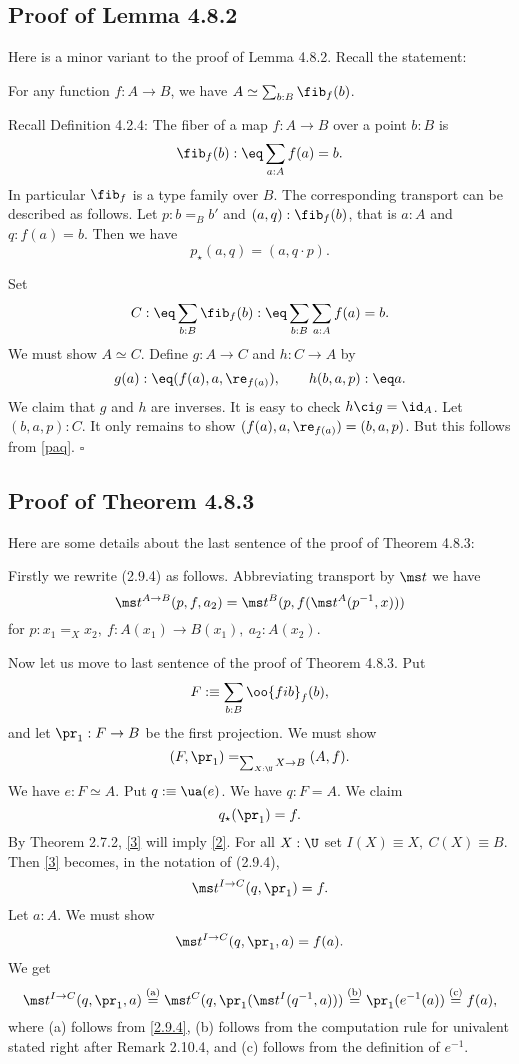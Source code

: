 \documentclass[12pt]{article}
\begin{document}

\subsection{Proof of Lemma 4.8.2}\label{482}

Here is a minor variant to the proof of Lemma 4.8.2. Recall the statement:

For any function $f:A\to B$, we have $A\simeq\sum_{b:B}\fib_f(b)$.

Recall Definition 4.2.4: The fiber of a map $f:A\to B$ over a point $b:B$ is 
$$
\fib_f(b):\eq\sum_{a:A}f(a)=b.
$$ 
In particular $\fib_f$ is a type family over $B$. The corresponding transport can be described as follows. Let $p:b=_Bb'$ and $(a,q):\fib_f(b)$, that is $a:A$ and $q:f(a)=b$. Then we have 
\begin{equation}\label{paq}
p_\star(a,q)=(a,q\cdot p).
\end{equation}

Set 
$$
C:\eq\sum_{b:B}\fib_f(b):\eq\sum_{b:B}\sum_{a:A}f(a)=b.
$$ 
We must show $A\simeq C$. Define $g:A\to C$ and $h:C\to A$ by 
$$
g(a):\eq(f(a),a,\re_{f(a)}),\qquad h(b,a,p):\eq a.
$$ 
We claim that $g$ and $h$ are inverses. It is easy to check $h\ci g=\id_A$. Let $(b,a,p):C$. It only remains to show $(f(a),a,\re_{f(a)})=(b,a,p)$. But this follows from \eqref{paq}. $\square$


\subsection{Proof of Theorem 4.8.3}

Here are some details about the last sentence of the proof of Theorem 4.8.3:

Firstly we rewrite (2.9.4) as follows. Abbreviating transport by $\ms t$ we have 
\begin{equation}\label{2.9.4}
\ms t^{A\to B}(p,f,a_2)=\ms t^B(p,f(\ms t^A(p^{-1},x)))
\end{equation}
for $p:x_1=_Xx_2,\ f:A(x_1)\to B(x_1),\ a_2:A(x_2)$. 

Now let us move to last sentence of the proof of Theorem 4.8.3. Put
$$
F:\equiv\sum_{b:B}\oo{fib}_f(b),
$$ 
and let $\pr_1:F\to B$ be the first projection. We must show 
\begin{equation}\label{2}
(F,\pr_1)=_{\sum_{X:\U}X\to B}(A,f).
\end{equation} 
We have $e:F\simeq A$. Put $q:\equiv\ua(e)$. We have $q:F=A$. We claim 
\begin{equation}\label{3}
q_\star(\pr_1)=f.
\end{equation} 
By Theorem 2.7.2, \eqref{3} will imply \eqref{2}. For all $X:\U$ set $I(X)\equiv X,\ C(X)\equiv B$. Then \eqref{3} becomes, in the notation of (2.9.4), 
$$
\ms t^{I\to C}(q,\pr_1)=f.
$$ 
Let $a:A$. We must show 
$$
\ms t^{I\to C}(q,\pr_1,a)=f(a).
$$ 
We get 
$$
\ms t^{I\to C}(q,\pr_1,a)\overset{\text{(a)}}=\ms t^C(q,\pr_1(\ms t^I(q^{-1},a)))\overset{\text{(b)}}=\pr_1(e^{-1}(a))\overset{\text{(c)}}=f(a),
$$ 
where (a) follows from \eqref{2.9.4}, (b) follows from the computation rule for univalent stated right after Remark 2.10.4, and (c) follows from the definition of $e^{-1}$.
\end{document}
